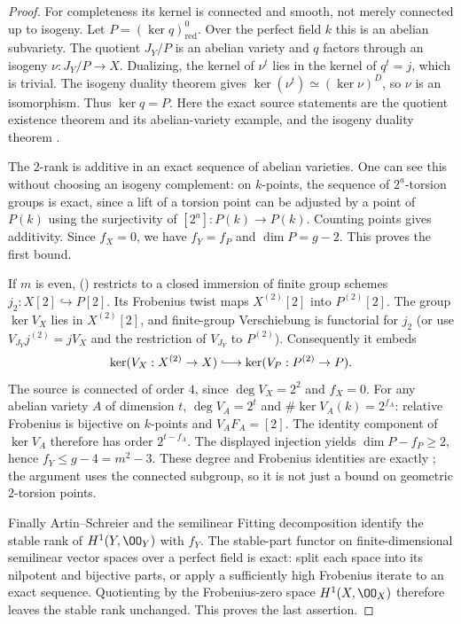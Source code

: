 \begin{proof}
For completeness its kernel is connected and smooth, not merely connected
up to isogeny.  Let $P=(\ker q)^0_{\mathrm{red}}$.  Over the perfect field
$k$ this is an abelian subvariety.  The quotient $J_Y/P$ is an abelian
variety and $q$ factors through an isogeny $\nu:J_Y/P\to X$.
Dualizing, the kernel of $\nu^t$ lies in the kernel of $q^t=j$, which is
trivial.  The isogeny duality theorem gives
$\ker(\nu^t)\simeq(\ker\nu)^D$, so $\nu$ is an isomorphism.
Thus $\ker q=P$.  Here the exact source statements are the quotient
existence theorem and its abelian-variety example, and the isogeny duality
theorem \cite[Theorem~4.38, Example~4.40, Theorem~7.5]{EdixhovenVanDerGeerMoonenAV}.

The $2$-rank is additive in an exact sequence of abelian varieties.
One can see this without choosing an isogeny complement: on $k$-points,
the sequence of $2^a$-torsion groups is exact, since a lift of a torsion
point can be adjusted by a point of $P(k)$ using the surjectivity of
$[2^a]:P(k)\to P(k)$.  Counting points gives additivity.
Since $f_X=0$, we have $f_Y=f_P$ and $\dim P=g-2$.  This proves the first
bound.

If $m$ is even, (\ast) restricts to a closed immersion of finite group
schemes $j_2:X[2]\hookrightarrow P[2]$.  Its Frobenius twist maps
$X^{(2)}[2]$ into $P^{(2)}[2]$.  The group $\ker V_X$ lies in
$X^{(2)}[2]$, and finite-group Verschiebung is functorial for $j_2$
(or use $V_{J_Y}j^{(2)}=jV_X$ and the restriction of $V_{J_Y}$ to
$P^{(2)}$).  Consequently it embeds
\[
 \ker(V_X:X^{(2)}\to X)\lhook\joinrel\longrightarrow
 \ker(V_P:P^{(2)}\to P).
\]
The source is connected of order $4$, since $\deg V_X=2^2$ and $f_X=0$.
For any abelian variety $A$ of dimension $t$, $\deg V_A=2^t$ and
$\#\ker V_A(k)=2^{f_A}$: relative Frobenius is bijective on $k$-points
and $V_AF_A=[2]$.  The identity component of $\ker V_A$ therefore has
order $2^{t-f_A}$.  The displayed injection yields
$\dim P-f_P\ge2$, hence $f_Y\le g-4=m^2-3$.
These degree and Frobenius identities are exactly
\cite[Propositions~5.19--5.22]{EdixhovenVanDerGeerMoonenAV}; the argument
uses the connected subgroup, so it is not just a bound on geometric
$2$-torsion points.

Finally Artin--Schreier and the semilinear Fitting decomposition identify
the stable rank of $H^1(Y,\OO_Y)$ with $f_Y$.  The stable-part functor on
finite-dimensional semilinear vector spaces over a perfect field is exact:
split each space into its nilpotent and bijective parts, or apply a
sufficiently high Frobenius iterate to an exact sequence.  Quotienting by
the Frobenius-zero space $H^1(X,\OO_X)$ therefore leaves the stable rank
unchanged.  This proves the last assertion.
\end{proof}

